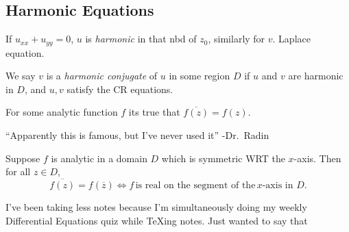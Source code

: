 \subsection{Harmonic Equations}
\begin{definition}[Harmonic]
If $u_{x x}+u_{yy}=0$, $u$ is \emph{harmonic} in that nbd of $z_0$, similarly for $v$. Laplace equation.
\end{definition}
\begin{definition}
   We say $v$ is a \emph{harmonic conjugate} of $u$ in some region $D$ if $u$ and $v$ are harmonic in $D$, and $u,v$ satisfy the CR equations. 
\end{definition}
   \begin{note}
       For some analytic function $f$ its true that $\overline{f(z)}=f(z)$.
   \end{note}
\begin{theorem}
   ``Apparently this is famous, but I've never used it'' -Dr.\ Radin
   
   Suppose $f$ is analytic in a domain $D$ which is symmetric WRT the $x$-axis. Then for all $z\in D$, \[
       \overline{f(z)}=f(\overline{z})\iff f \, \text{is real on the segment of the}\, x\text{-axis in }D. 
   \] 
\end{theorem}
\begin{note}
I've been taking less notes because I'm simultaneously doing my weekly Differential Equations quiz while \TeX{}ing notes. Just wanted to say that
\end{note}
